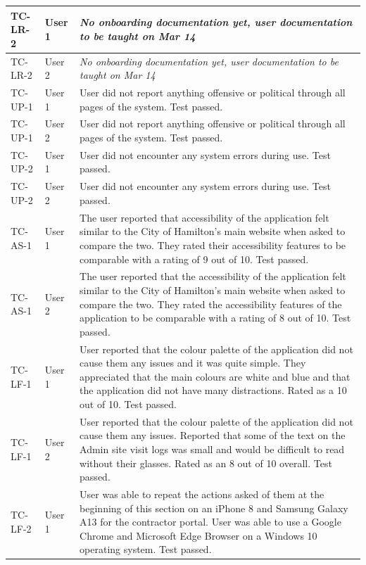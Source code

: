 \documentclass[12pt, titlepage]{article}
\begin{document}
\begin{longtable}{|m{2cm}|m{1.5cm}|m{9cm}|}
  \hline
  TC-LR-2 & User 1 & \textit{No onboarding documentation yet, user
  documentation to be taught on Mar 14} \\
  \hline
  TC-LR-2 & User 2 & \textit{No onboarding documentation yet, user
  documentation to be taught on Mar 14}\\
  \hline
  TC-UP-1 & User 1& User did not report anything offensive or
  political through all pages of the system. Test passed.\\
  \hline
  TC-UP-1 & User 2& User did not report anything offensive or
  political through all pages of the system. Test passed.\\
  \hline
  TC-UP-2 & User 1& User did not encounter any system errors during
  use. Test passed.\\
  \hline
  TC-UP-2 & User 2& User did not encounter any system errors during
  use. Test passed.\\
  \hline
  TC-AS-1 & User 1& The user reported that accessibility of the
  application felt similar to the City of Hamilton's main website
  when asked to compare the two. They rated their accessibility
  features to be comparable with a rating of 9 out of 10. Test passed.\\
  \hline
  TC-AS-1 & User 2& The user reported that the accessibility of the
  application felt similar to the City of Hamilton's main
  website when asked to compare the two. They rated the accessibility
  features of the application to be comparable with a rating
  of 8 out of 10. Test passed.\\
  \hline
  TC-LF-1 & User 1& User reported that the colour palette of the
  application did not cause them any issues and it was quite simple.
  They appreciated that the main colours are white and blue and that
  the application did not have many distractions. Rated as a 10 out of 10.
  Test passed.\\
  \hline
  TC-LF-1 & User 2& User reported that the colour palette of the
  application did not cause them any issues.
  Reported that some of the text on the Admin site visit logs was
  small and would be difficult to read without their glasses.
  Rated as an 8 out of 10 overall. Test passed.\\
  \hline
  TC-LF-2 & User 1& User was able to repeat the actions asked of them
  at the beginning of this section on an iPhone 8 and Samsung Galaxy A13
  for the contractor portal. User was able to use a Google Chrome and
  Microsoft Edge Browser on a Windows 10 operating system. Test passed.\\

\end{longtable}
\end{document}

